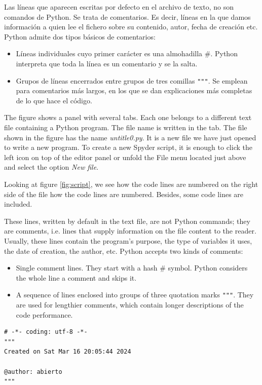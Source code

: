 \begin{paracol}{2}
Las líneas que aparecen escritas por defecto en el archivo de texto, no son comandos de Python. Se trata de comentarios. Es decir, líneas en la que damos información a quien lee el fichero sobre su contenido, autor, fecha de creación etc. Python admite dos tipos básicos de comentarios:
\begin{itemize}
    \item Líneas individuales cuyo primer carácter es una almohadilla \#. Python interpreta que toda la línea es un comentario y se la salta.
    \item Grupos de líneas encerrados entre grupos de tres comillas \verb|"""|. Se emplean para comentarios más largos, en los que se dan explicaciones más completas de lo que hace el código.
\end{itemize}
\switchcolumn
The figure shows a panel with several tabs. Each one belongs to a different text file containing a Python program. The file name is written in the tab. The file shown in the figure has the name \emph{untitle0.py}. It is a new file we have just opened to write a new program. To create a new Spyder script, it is enough to click the left icon on top of the editor panel or unfold the File menu located just above and select the option \emph{New file}.

Looking at figure \ref{fig:script}, we see how the code lines are numbered on the right side of the file how the code lines are numbered. Besides, some code lines are included.

These lines, written by default in the text file, are not Python commands; they are comments, i.e. lines that supply information on the file content to the reader. Usually, these lines contain the program's purpose, the type of variables it uses, the date of creation, the author, etc. Python accepts two kinds of comments:
\begin{itemize}
    \item Single comment lines. They start with a hash \#  symbol. Python considers the whole line a comment and skips it.
    \item A sequence of lines enclosed into groups of three quotation marks \verb|"""|. They are used for lengthier comments, which contain longer descriptions of the code performance. 
\end{itemize}
\end{paracol}


\begin{verbatim}
# -*- coding: utf-8 -*-
"""
Created on Sat Mar 16 20:05:44 2024

@author: abierto
"""
\end{verbatim}

